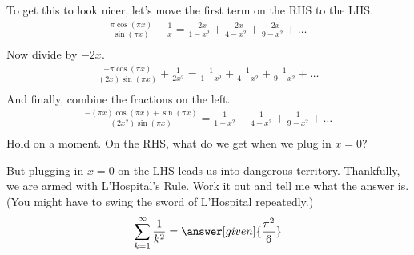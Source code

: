 \documentclass{ximera}
\begin{document}
\begin{exercise}
	To get this to look nicer, let's move the first term on the RHS to the LHS.
	\begin{align*}
		\frac{\pi \cos(\pi x)}{\sin(\pi x)} -\frac{1}{x}= \frac{-2x}{1-x^2}+\frac{-2x}{4-x^2}+\frac{-2x}{9-x^2}+\ldots \\	
	\end{align*}
	Now divide by $-2x$.
	\begin{align*}
		\frac{-\pi \cos(\pi x)}{(2x) \sin(\pi x)} +\frac{1}{2x^2}= \frac{1}{1-x^2}+\frac{1}{4-x^2}+\frac{1}{9-x^2}+\ldots \\	
	\end{align*}
	And finally, combine the fractions on the left.
	\begin{align*}
		\frac{- (\pi x) \cos(\pi x )+\sin(\pi x)}{(2x^2)\sin(\pi x)}= \frac{1}{1-x^2}+\frac{1}{4-x^2}+\frac{1}{9-x^2}+\ldots \\	
	\end{align*}
	Hold on a moment. On the RHS, what do we get when we plug in $x=0$?
	\begin{multipleChoice}
	\end{multipleChoice}
	But plugging in $x=0$ on the LHS leads us into dangerous territory. Thankfully, we are armed with L'Hospital's Rule. Work it out and tell me what the answer is. (You might have to swing the sword of L'Hospital repeatedly.)
	\begin{align*}
		\sum_{k=1}^{\infty} \frac{1}{k^2} = \answer[given]{\frac{\pi^2}{6}}	
	\end{align*}
\end{exercise}
\end{document}
